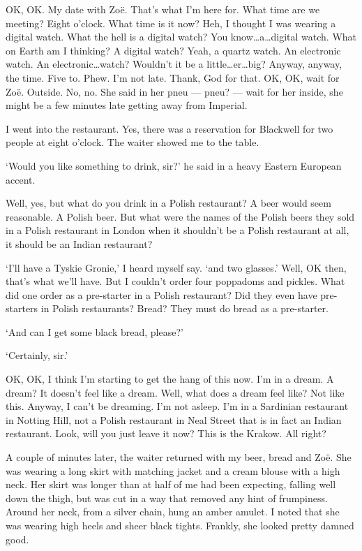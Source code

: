 OK, OK. My date with Zo{\"e}. That's what I'm here for. What time
are we meeting? Eight o'clock. What time is it now? Heh, I
thought I was wearing a digital watch. What the hell is a {\twelveit
digital\/} watch? You know\dots a\dots digital watch. What on Earth
am I thinking? A digital watch? Yeah, a quartz watch. An electronic
watch. An electronic\dots {\twelveit watch?} Wouldn't it be a
little\dots er\dots big? Anyway, anyway, the time. Five to. Phew.
I'm not late. Thank, God for that. OK, OK, wait for Zo{\"e}.
Outside. No, no. She said in her pneu --- {\twelveit pneu?} --- wait
for her inside, she might be a few minutes late getting away from Imperial.

I went into the restaurant. Yes, there was a reservation for
Blackwell for two people at eight o'clock. The waiter showed me to
the table.

`Would you like something to drink, sir?' he said in a heavy Eastern
European accent.

Well, yes, but what do you drink in a Polish restaurant? A beer
would seem reasonable. A Polish beer. But what were the names of the
Polish beers they sold in a Polish restaurant in London when it
shouldn't be a Polish restaurant at all, it should be an Indian
restaurant?

`I'll have a Tyskie Gronie,' I heard myself say. `and two glasses.' Well, OK then,
that's what we'll have. But I couldn't order four poppadoms and
pickles. What did one order as a pre-starter in a Polish restaurant?
Did they even have pre-starters in Polish restaurants? Bread? They
must do bread as a pre-starter.

`And can I get some black bread, please?'

`Certainly, sir.'

OK, OK, I think I'm starting to get the hang of this now. I'm in a
dream. A dream? It doesn't feel like a dream. Well, what does a
dream feel like? Not like this. Anyway, I can't be dreaming. I'm not
asleep. I'm in a Sardinian restaurant in Notting Hill, not a Polish
restaurant in Neal Street that is in fact an Indian restaurant. Look,
will you just leave it now? This is the Krakow. All right?

A couple of minutes later, the waiter returned with my beer, bread
and Zo{\"e}. She was wearing a long skirt with matching jacket and a
cream blouse with a high neck. Her skirt was longer than at half of me had been
expecting, falling well down the thigh, but was cut in a way that
removed any hint of frumpiness. Around her neck, from a silver
chain, hung an amber amulet. I noted that she was
wearing high heels and sheer black tights. Frankly, she looked pretty damned good.

